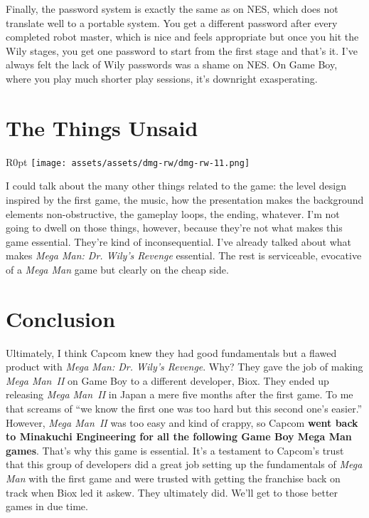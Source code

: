 \documentclass{book}
\begin{document}
Finally, the password system is exactly the same as on NES, which does not translate well to a portable system. You get a different password after every completed robot master, which is nice and feels appropriate but once you hit the Wily stages, you get one password to start from the first stage and that’s it. I’ve always felt the lack of Wily passwords was a shame on NES. On Game Boy, where you play much shorter play sessions, it’s downright exasperating.

\FloatBarrier\needspace{10mm}\section*{The Things Unsaid}\nopagebreak[4]

\begin{wrapfigure}{R}{0pt} \texttt{[image: assets/assets/dmg-rw/dmg-rw-11.png]}\end{wrapfigure}
I could talk about the many other things related to the game: the level design inspired by the first game, the music, how the presentation makes the background elements non-obstructive, the gameplay loops, the ending, whatever. I’m not going to dwell on those things, however, because they’re not what makes this game essential. They’re kind of inconsequential. I’ve already talked about what makes \emph{Mega Man: Dr. Wily’s Revenge} essential. The rest is serviceable, evocative of a \emph{Mega Man} game but clearly on the cheap side.

\FloatBarrier\needspace{10mm}\section*{Conclusion}\nopagebreak[4]

Ultimately, I think Capcom knew they had good fundamentals but a flawed product with \emph{Mega Man: Dr. Wily’s Revenge}. Why? They gave the job of making \emph{Mega Man~II} on Game Boy to a different developer, Biox. They ended up releasing \emph{Mega Man~II} in Japan a mere five months after the first game. To me that screams of “we know the first one was too hard but this second one’s easier.” However, \emph{Mega Man~II} was too easy and kind of crappy, so Capcom \textbf{went back to Minakuchi Engineering for all the following Game Boy Mega Man games}. That’s why this game is essential. It’s a testament to Capcom’s trust that this group of developers did a great job setting up the fundamentals of \emph{Mega Man} with the first game and were trusted with getting the franchise back on track when Biox led it askew. They ultimately did. We’ll get to those better games in due time.
\end{document}
